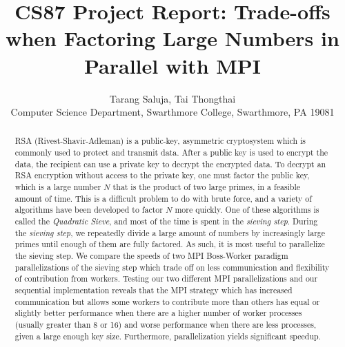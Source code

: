 \documentclass[11pt,twocolumn]{article}
\begin{document}
\title{CS87 Project Report: Trade-offs when Factoring Large Numbers in Parallel with MPI}

\author{Tarang Saluja, Tai Thongthai\\
Computer Science Department, Swarthmore College, Swarthmore, PA  19081}

\maketitle


\begin{abstract}
RSA (Rivest-Shavir-Adleman) is a public-key, asymmetric cryptosystem which is commonly used to protect and transmit data. After a public key is used to encrypt the data, the recipient can use a private key to decrypt the encrypted data. To decrypt an RSA encryption without access to the private key, one must factor the public key, which is a large number $N$ that is the product of two large primes, in a feasible amount of time. This is a difficult problem to do with brute force, and a variety of algorithms have been developed to factor $N$ more quickly. One of these algorithms is called the \textit{Quadratic Sieve}, and most of the time is spent in the \textit{sieving step}. During the \textit{sieving step}, we repeatedly divide a large amount of numbers by increasingly large primes until enough of them are fully factored. As such, it is most useful to parallelize the sieving step. We compare the speeds of two MPI Boss-Worker paradigm parallelizations of the sieving step which trade off on less communication and flexibility of contribution from workers. Testing our two different MPI parallelizations and our sequential implementation reveals that the MPI strategy which has increased communication but allows some workers to contribute more than others has equal or slightly better performance when there are a higher number of worker processes (usually greater than 8 or 16) and worse performance when there are less processes, given a large enough key size. Furthermore, parallelization yields significant speedup.
\end{abstract}
\end{document}

